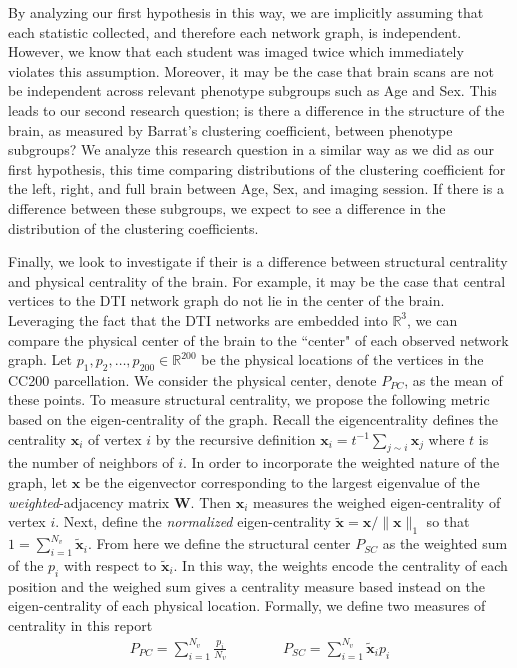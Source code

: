 \documentclass[01pt]{article}
\newcommand{\bvar}[1]{\mathbf{#1}}
\begin{document}
By analyzing our first hypothesis in this way, we are implicitly assuming that each statistic collected, and therefore each network graph, is independent. 
However, we know that each student was imaged twice which immediately violates this assumption. 
Moreover, it may be the case that brain scans are not be independent across relevant phenotype subgroups such as Age and Sex. 
This leads to our second research question; is there a difference in the structure of the brain, as measured by Barrat's clustering coefficient, between phenotype subgroups? 
We analyze this research question in a similar way as we did as our first hypothesis, this time comparing distributions of the clustering coefficient for the left, right, and full brain between Age, Sex, and imaging session. 
If there is a difference between these subgroups, we expect to see a difference in the distribution of the clustering coefficients. 

Finally, we look to investigate if their is a difference between structural centrality and physical centrality of the brain.
For example, it may be the case that central vertices to the DTI network graph do not lie in the center of the brain. 
Leveraging the fact that the DTI networks are embedded into $\mathbb{R}^3$, we can compare the physical center of the brain to the ``center" of each observed network graph. 
Let $p_1, p_2, \ldots, p_{200}\in\mathbb{R}^{200}$ be the physical locations of the vertices in the CC200 parcellation. 
We consider the physical center, denote $P_{PC}$, as the mean of these points. 
To measure structural centrality, we propose the following metric based on the eigen-centrality of the graph.
Recall the eigencentrality defines the centrality $\bvar{x}_i$ of vertex $i$ by the recursive definition $\bvar{x}_i = t^{-1}\sum_{j\sim i}\bvar{x}_j$ where $t$ is the number of neighbors of $i$.   
In order to incorporate the weighted nature of the graph,
let $\bvar{x}$ be the eigenvector corresponding to the largest eigenvalue of the \textit{weighted}-adjacency matrix $\bvar{W}$. 
Then $\bvar{x}_i$ measures the weighed eigen-centrality of vertex $i$.
Next, define the \textit{normalized} eigen-centrality $\tilde{\bvar{x}} = \bvar{x}/\|\bvar{x}\|_1$ so that $1 = \sum_{i=1}^{N_v}\tilde{\bvar{x}}_i$. 
From here we define the structural center $P_{SC}$ as the weighted sum of the $p_i$ with respect to $\tilde{\bvar{x}}_i$.
In this way, the weights encode the centrality of each position and the weighed sum gives a centrality measure based instead on the eigen-centrality of each physical location. 
Formally, we define two measures of centrality in this report
\begin{align}
    P_{PC} = \sum_{i=1}^{N_v}\frac{p_i}{N_v}\hspace{4em}P_{SC} = \sum_{i=1}^{N_v}\tilde{\bvar{x}}_ip_i
\end{align}
\end{document}

